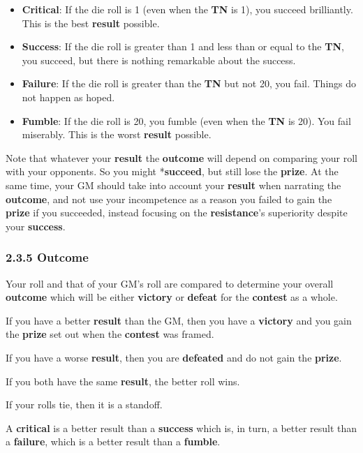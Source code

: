 \documentclass[
]{article}
\providecommand{\tightlist}{%
  \setlength{\itemsep}{0pt}\setlength{\parskip}{0pt}}
\begin{document}
\begin{itemize}
\tightlist
\item
  \textbf{Critical}: If the die roll is 1 (even when the \textbf{TN} is
  1), you succeed brilliantly. This is the best \textbf{result}
  possible.
\item
  \textbf{Success}: If the die roll is greater than 1 and less than or
  equal to the \textbf{TN}, you succeed, but there is nothing remarkable
  about the success.
\item
  \textbf{Failure}: If the die roll is greater than the \textbf{TN} but
  not 20, you fail. Things do not happen as hoped.
\item
  \textbf{Fumble}: If the die roll is 20, you fumble (even when the
  \textbf{TN} is 20). You fail miserably. This is the worst
  \textbf{result} possible.
\end{itemize}

Note that whatever your \textbf{result} the \textbf{outcome} will depend
on comparing your roll with your opponents. So you might
*\textbf{succeed}, but still lose the \textbf{prize}. At the same time,
your GM should take into account your \textbf{result} when narrating the
\textbf{outcome}, and not use your incompetence as a reason you failed
to gain the \textbf{prize} if you succeeded, instead focusing on the
\textbf{resistance}'s superiority despite your \textbf{success}.

\hypertarget{outcome}{%
\subsubsection{2.3.5 Outcome}\label{outcome}}

Your roll and that of your GM's roll are compared to determine your
overall \textbf{outcome} which will be either \textbf{victory} or
\textbf{defeat} for the \textbf{contest} as a whole.

If you have a better \textbf{result} than the GM, then you have a
\textbf{victory} and you gain the \textbf{prize} set out when the
\textbf{contest} was framed.

If you have a worse \textbf{result}, then you are \textbf{defeated} and
do not gain the \textbf{prize}.

If you both have the same \textbf{result}, the better roll wins.

If your rolls tie, then it is a standoff.

A \textbf{critical} is a better result than a \textbf{success} which is,
in turn, a better result than a \textbf{failure}, which is a better
result than a \textbf{fumble}.
\end{document}
